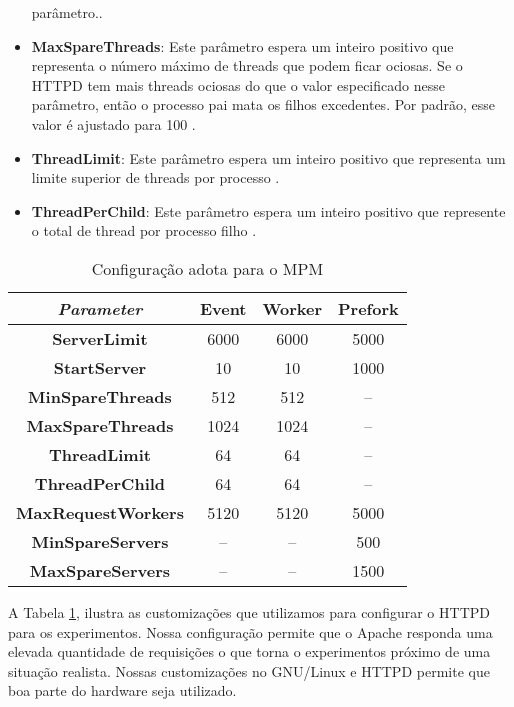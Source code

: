 \begin{itemize}
        parâmetro.\cite{mpm_minsparethreads}.
  \item \textbf{MaxSpareThreads}: Este parâmetro espera um inteiro positivo que
        representa o número máximo de threads que podem ficar ociosas. Se o
        HTTPD tem mais threads ociosas do que o valor especificado nesse
        parâmetro, então o processo pai mata os filhos excedentes. Por padrão,
        esse valor é ajustado para 100 \cite{mpm_maxsparethreads}.
  \item \textbf{ThreadLimit}: Este parâmetro espera um inteiro positivo que
        representa um limite superior de threads por processo
        \cite{mpm_threadlimits}.
  \item \textbf{ThreadPerChild}: Este parâmetro espera um inteiro positivo que
        represente o total de thread por processo filho
        \cite{mpm_threadperchild}.
\end{itemize}

\begin{table}
  \centering
  \begin{tabular}{|c|c|c|c|}
    \hline
    \textit{Parameter} & \textbf{Event} & \textbf{Worker} & \textbf{Prefork} \\
    \hline
    \textbf{ServerLimit} & 6000 & 6000 & 5000\\
    \hline
    \textbf{StartServer} & 10 & 10 & 1000\\
    \hline
    \textbf{MinSpareThreads} & 512 & 512 & --\\
    \hline
    \textbf{MaxSpareThreads} & 1024 & 1024 & --\\
    \hline
    \textbf{ThreadLimit} & 64 & 64 & --\\
    \hline
    \textbf{ThreadPerChild} & 64 & 64 & --\\
    \hline
    \textbf{MaxRequestWorkers} & 5120 & 5120 & 5000\\
    \hline
    \textbf{MinSpareServers} & -- & -- & 500\\
    \hline
    \textbf{MaxSpareServers} & -- & -- & 1500\\
    \hline
  \end{tabular}
  \caption{Configuração adota para o MPM}
  \label{tab:configuration}
\end{table}

A Tabela \ref{tab:configuration}, ilustra as customizações que utilizamos para
configurar o HTTPD para os experimentos. Nossa configuração permite que o
Apache responda uma elevada quantidade de requisições o que torna o
experimentos próximo de uma situação realista. Nossas customizações no
GNU/Linux e HTTPD permite que boa parte do hardware seja utilizado.

